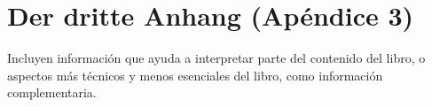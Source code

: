 \chapter{Der dritte Anhang (Ap\'endice 3)}\label{apendice3}


Incluyen información que ayuda a interpretar parte del contenido del libro, o aspectos más técnicos y menos esenciales del libro, como información complementaria.

\bigskip




\endinput 